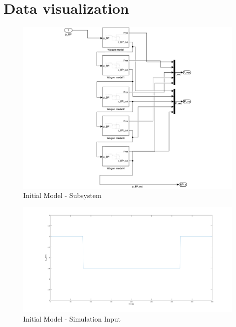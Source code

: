 \documentclass[12pt,a4paper]{book}
\newcommand{\TODO}[1]{\textbf{\textcolor{red}{$<$TODO$>$ #1 $</>$}}}
\begin{document}


\chapter{Data visualization}

%
\begin{figure}[H]
	\centering
	\includegraphics[width=\linewidth]{./pic/initmodel_subsys}
	\caption{Initial Model - Subsystem}
	\label{fig:initmodel_subsys}
\end{figure}

\begin{figure}[H]
	\centering
	\includegraphics[width=\linewidth]{./pic/initmodel_input}
	\caption{Initial Model - Simulation Input}
	\label{fig:initmodel_input}
\end{figure}
\end{document}
